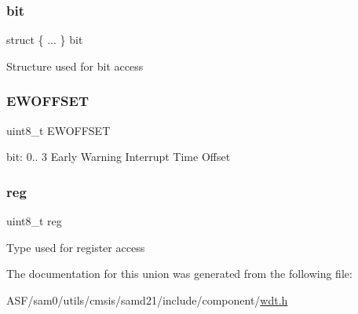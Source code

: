 \subsubsection{\texorpdfstring{bit}{bit}}
{\footnotesize\ttfamily struct \{ ... \}   bit}

Structure used for bit access \mbox{\label{union_w_d_t___e_w_c_t_r_l___type_af3804ffa2fc8555be85fb7e459584750}} 
\subsubsection{\texorpdfstring{EWOFFSET}{EWOFFSET}}
{\footnotesize\ttfamily uint8\+\_\+t E\+W\+O\+F\+F\+S\+ET}

bit\+: 0.. 3 Early Warning Interrupt Time Offset \mbox{\label{union_w_d_t___e_w_c_t_r_l___type_a9428adc9af4653a2050e2536b55dec8d}} 
\subsubsection{\texorpdfstring{reg}{reg}}
{\footnotesize\ttfamily uint8\+\_\+t reg}

Type used for register access 

The documentation for this union was generated from the following file\+:\begin{DoxyCompactItemize}
\item 
A\+S\+F/sam0/utils/cmsis/samd21/include/component/\mbox{\hyperlink{component_2wdt_8h}{wdt.\+h}}\end{DoxyCompactItemize}
